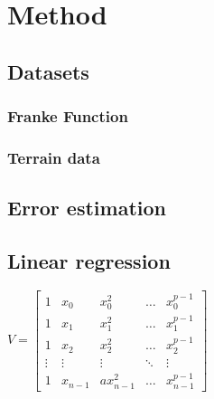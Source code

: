 \section{Method}



\subsection{Datasets}
\subsubsection{Franke Function}
\subsubsection{Terrain data}

\subsection{Error estimation}


\subsection{Linear regression}

\begin{center}
$V=
\begin{bmatrix} 
1 & x_{0}&x_{0}^{2}&\dots &x_{0}^{p-1}
\\1&x_{1}&x_{1}^{2}&\dots &x_{1}^{p-1}
\\1&x_{2}&x_{2}^{2}&\dots &x_{2}^{p-1}
\\ \vdots &\vdots &\vdots &\ddots &\vdots \\
1&x_{n-1}&ax_{n-1}^{2}&\dots &x_{n-1}^{p-1}
\end{bmatrix}
$
\end{center}



